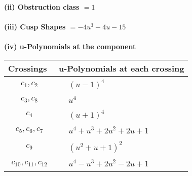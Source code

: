 \documentclass[1p]{elsarticle_modified}
\theoremstyle{definition}
\begin{document}
\flushleft \textbf{(ii) Obstruction class $= 1$}\\~\\
\flushleft \textbf{(iii) Cusp Shapes $= -4 u^3-4 u-15$}\\~\\
\newpage\renewcommand{\arraystretch}{1}
\flushleft \textbf{(iv) u-Polynomials at the component}\newline \\
\begin{tabular}{m{50pt}|m{274pt}}
Crossings & \hspace{64pt}u-Polynomials at each crossing \\
\hline $$\begin{aligned}c_{1},c_{2}\end{aligned}$$&$\begin{aligned}
&(u-1)^4
\end{aligned}$\\
\hline $$\begin{aligned}c_{3},c_{8}\end{aligned}$$&$\begin{aligned}
&u^4
\end{aligned}$\\
\hline $$\begin{aligned}c_{4}\end{aligned}$$&$\begin{aligned}
&(u+1)^4
\end{aligned}$\\
\hline $$\begin{aligned}c_{5},c_{6},c_{7}\end{aligned}$$&$\begin{aligned}
&u^4+u^3+2 u^2+2 u+1
\end{aligned}$\\
\hline $$\begin{aligned}c_{9}\end{aligned}$$&$\begin{aligned}
&(u^2+u+1)^2
\end{aligned}$\\
\hline $$\begin{aligned}c_{10},c_{11},c_{12}\end{aligned}$$&$\begin{aligned}
&u^4- u^3+2 u^2-2 u+1
\end{aligned}$\\
\hline
\end{tabular}\\~\\
\end{document}
